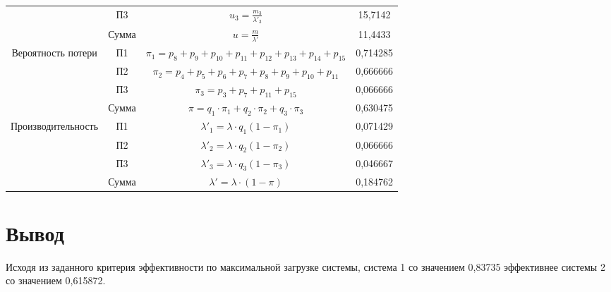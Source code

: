 \begin{adjustbox}{max width=\textwidth}
\begin{tabular}{|c|c|c|c|}
                                    & П3     & $u_3 = \frac{m_3}{\lambda'_3}$                                                                           & 15,7142  \\ \cline{2-4}
                                    & Сумма  & $u = \frac{m}{\lambda'}$                                                                                 & 11,4433  \\ \hline
\multirow{4}{*}{Вероятность потери} & П1     & $\pi_1 = p_8+p_9+p_{10}+p_{11}+p_{12}+p_{13}+p_{14}+p_{15}$                                              & 0,714285 \\ \cline{2-4}
                                    & П2     & $\pi_2 = p_4+p_5+p_6+p_7+p_8+p_9+p_{10}+p_{11}$                                                          & 0,666666 \\ \cline{2-4}
                                    & П3     & $\pi_3 = p_3 + p_7 + p_{11} + p_{15}$                                                                    & 0,066666 \\ \cline{2-4}
                                    & Сумма  & $\pi = q_1 \cdot \pi_1 + q_2 \cdot \pi_2 + q_3 \cdot \pi_3$                                              & 0,630475 \\ \hline
\multirow{4}{*}{Производительность} & П1     & $\lambda'_1 = \lambda \cdot q_1(1 - \pi_1)$                                                              & 0,071429 \\ \cline{2-4}
                                    & П2     & $\lambda'_2 = \lambda \cdot q_2(1 - \pi_2)$                                                              & 0,066666 \\ \cline{2-4}
                                    & П3     & $\lambda'_3 = \lambda \cdot q_3(1 - \pi_3)$                                                              & 0,046667 \\ \cline{2-4}
                                    & Сумма  & $\lambda' = \lambda \cdot (1 - \pi)$                                                                     & 0,184762 \\ \hline
\end{tabular}
\end{adjustbox}

\section{Вывод}
Исходя из заданного критерия эффективности по максимальной загрузке системы,
система 1 со значением 0,83735 эффективнее системы 2 со значением 0,615872.

